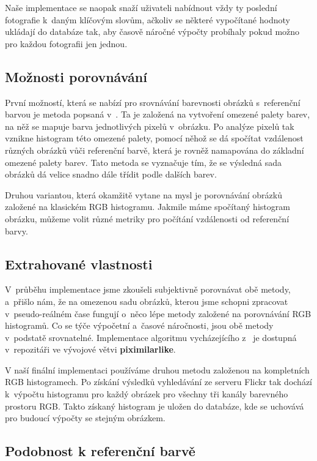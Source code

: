\documentclass[12pt,oneside,a4paper]{article}
\begin{document}
Naše implementace se naopak snaží uživateli nabídnout vždy ty poslední fotografie k~daným klíčovým slovům, ačkoliv se některé vypočítané hodnoty ukládají do databáze tak, aby časově náročné výpočty probíhaly pokud možno pro každou fotografii jen jednou.

\subsection{Možnosti porovnávání}
První možností, která se nabízí pro srovnávání barevnosti obrázků s~referenční barvou je metoda popsaná v~\cite{Mueller2k9}. Ta je založená na vytvoření omezené palety barev, na něž se mapuje barva jednotlivých pixelů v~obrázku. Po analýze pixelů tak vznikne histogram této omezené palety, pomocí něhož se dá spočítat vzdálenost různých obrázků vůči referenční barvě, která je rovněž namapována do základní omezené palety barev. Tato metoda se vyznačuje tím, že se výsledná sada obrázků dá velice snadno dále třídit podle dalších barev.

Druhou variantou, která okamžitě vytane na mysl je porovnávání obrázků založené na klasickém RGB histogramu. Jakmile máme spočítaný histogram obrázku, můžeme volit různé metriky pro počítání vzdálenosti od referenční barvy.

\subsection{Extrahované vlastnosti}

V~průběhu implementace jsme zkoušeli subjektivně porovnávat obě metody, a~přišlo nám, že na omezenou sadu obrázků, kterou jsme schopni zpracovat v~pseudo-reálném čase fungují o~něco lépe metody založené na porovnávání RGB histogramů. Co se týče výpočetní a~časové náročnosti, jsou obě metody v~podstatě srovnatelné. Implementace algoritmu vycházejícího z~\cite{Mueller2k9} je dostupná v~repozitáři \cite{official} ve vývojové větvi \textbf{piximilarlike}.

V naší finální implementaci používáme druhou metodu založenou na kompletních RGB histogramech. Po získání výsledků vyhledávání ze serveru Flickr tak dochází k~výpočtu histogramu pro každý obrázek pro všechny tři kanály barevného prostoru RGB. Takto získaný histogram je uložen do databáze, kde se uchovává pro budoucí výpočty se stejným obrázkem.

\subsection{Podobnost k referenční barvě}
\label{sec:podobnost}
\end{document}
